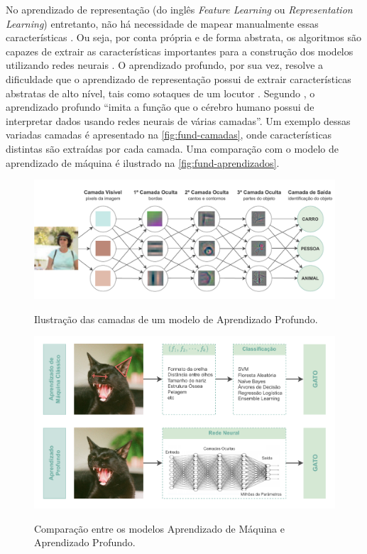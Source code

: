 No aprendizado de representação (do inglês \textit{Feature Learning} ou \textit{Representation Learning}) entretanto, não há necessidade de mapear manualmente essas características \cite{ref:Goodfellow-Bengio-Courville}. Ou seja, por conta própria e de forma abstrata, os algoritmos são capazes de extrair as características importantes para a construção dos modelos utilizando redes neurais \cite{ref:Robins} \cite{ref:Lesort}. O aprendizado profundo, por sua vez, resolve a dificuldade que o aprendizado de representação possui de extrair características abstratas de alto nível, tais como sotaques de um locutor \cite{ref:Goodfellow-Bengio-Courville}. Segundo , o aprendizado profundo ``imita a função que o cérebro humano possui de interpretar dados usando redes neurais de várias camadas''. Um exemplo dessas variadas camadas é apresentado na \autoref{fig:fund-camadas}, onde características distintas são extraídas por cada camada. Uma comparação com o modelo de aprendizado de máquina é ilustrado na \autoref{fig:fund-aprendizados}.

\begin{figure}[h!] %
  \centering
  \caption{Ilustração das camadas de um modelo de Aprendizado Profundo.}
  \includegraphics[scale=0.8]{img/img-fundamentacao-deep-learning.pdf}
  \label{fig:fund-camadas}
\end{figure}

\begin{figure}[h!] %
  \centering
  \caption{Comparação entre os modelos Aprendizado de Máquina e Aprendizado Profundo.}
  \includegraphics[scale=0.95]{img/img-fundamentacao-aprendizados.pdf}
  \label{fig:fund-aprendizados}
\end{figure}


